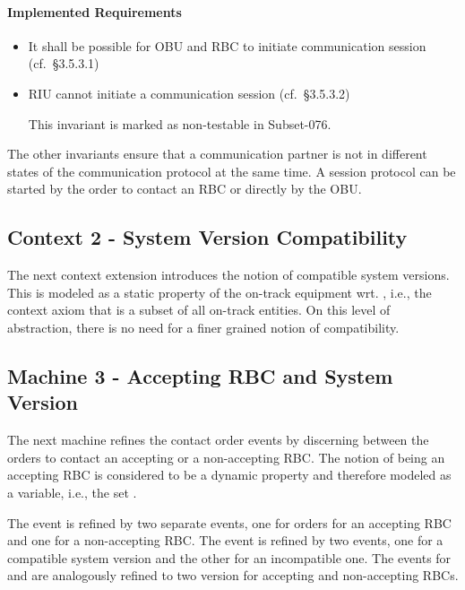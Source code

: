 \documentclass{template/openetcs_article}
\begin{document}
\paragraph{Implemented Requirements}
\label{sec:impl-requ-1}

\begin{itemize}
\item It shall be possible for OBU and RBC to initiate communication session
  (cf.~§3.5.3.1)
\item RIU cannot initiate a communication session (cf.~§3.5.3.2)

This invariant is marked as non-testable in Subset-076.
\end{itemize}

The other invariants ensure that a communication partner is not in different
states of the communication protocol at the same time. A session protocol can be
started by the order to contact an RBC or directly by the OBU.



\subsection{Context 2 - System Version Compatibility}
\label{sec:context-2-system}

The next context extension introduces the notion of compatible system
versions. This is modeled as a static property of the on-track equipment
wrt. , i.e., the context axiom that
 is a subset of all on-track entities. On this
level of abstraction, there is no need for a finer grained notion of
compatibility.



\subsection{Machine 3 - Accepting RBC and System Version}
\label{sec:machine-3-accepting}

The next machine refines the contact order events by discerning between the
orders to contact an accepting or a non-accepting RBC. The notion of being an
accepting RBC is considered to be a dynamic property and therefore modeled as a
variable, i.e., the set .

The  event is refined by two separate events, one
for orders for an accepting RBC and one for a non-accepting RBC. The
 event is refined by two events, one for a
compatible system version and the other for an incompatible one. The events for
 and 
are analogously refined to two version for accepting and non-accepting RBCs.
\end{document}
